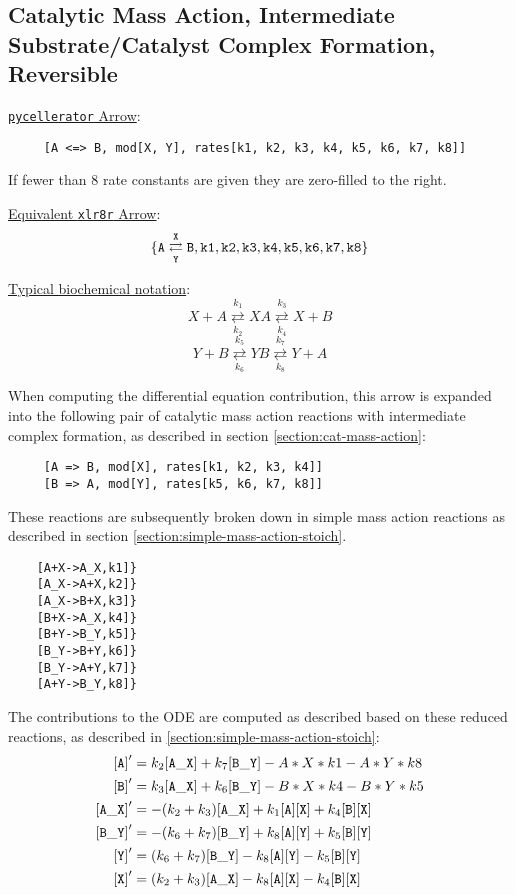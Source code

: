 \subsection{Catalytic Mass Action, Intermediate Substrate/Catalyst Complex Formation, Reversible}
\label{section:cat-mass-action-reversible}
\underline{{\tt pycellerator} Arrow}: 
\begin{lstlisting}
     [A <=> B, mod[X, Y], rates[k1, k2, k3, k4, k5, k6, k7, k8]]
\end{lstlisting}

If fewer than 8 rate constants are given they are zero-filled to the right. 

\underline{Equivalent {\tt xlr8r} Arrow}:
$$\tt\{A \underset{Y}{\overset{X}{\rightleftarrows}} B,k1,k2,k3,k4, k5, k6, k7, k8 \}$$

\underline{Typical biochemical notation}: 
$$ X+A\underset{k_2}{\overset{k_1}  \rightleftarrows } XA \underset{k_4}{ \overset{k_3}{\rightleftarrows}} X+B$$
$$ Y+B\underset{k_6}{\overset{k_5}  \rightleftarrows }  YB \underset{k_8}{ \overset{k_7}{\rightleftarrows}} Y+A$$

When computing the differential equation contribution, this arrow is expanded into the following pair of catalytic mass action reactions with intermediate complex formation, as described in section \ref{section:cat-mass-action}: 
\begin{lstlisting}
     [A => B, mod[X], rates[k1, k2, k3, k4]]
     [B => A, mod[Y], rates[k5, k6, k7, k8]]
\end{lstlisting}
These reactions are subsequently broken down in simple mass action reactions as described in section \ref{section:simple-mass-action-stoich}. 
\begin{lstlisting}
    [A+X->A_X,k1]} 
    [A_X->A+X,k2]}
    [A_X->B+X,k3]} 
    [B+X->A_X,k4]}
    [B+Y->B_Y,k5]}
    [B_Y->B+Y,k6]}
    [B_Y->A+Y,k7]}
    [A+Y->B_Y,k8]}
\end{lstlisting}
The contributions to the ODE are computed as described based on these reduced reactions, as described in \ref{section:simple-mass-action-stoich}: 
\begin{align*}
{\tt [A]}'    &=  k_2{\tt [A\_X]} + k_7{\tt [B\_Y]} - A*X*k1 - A*Y*k8\\
{\tt [B]}'    &=  k_3{\tt [A\_X]} + k_6{\tt [B\_Y]} - B*X*k4 - B*Y*k5\\
{\tt [A\_X]}' &= -(k_2+k_3){\tt [A\_X]} + k_1{\tt [A][X]} + k_4{\tt [B][X]}\\
{\tt [B\_Y]}' &= -(k_6+k_7){\tt [B\_Y]} + k_8{\tt [A][Y]} + k_5{\tt [B][Y]}\\
{\tt [Y]}'    &=  (k_6+k_7){\tt [B\_Y]} - k_8{\tt [A][Y]} - k_5{\tt [B][Y]}\\
{\tt [X]}   ' &=  (k_2+k_3){\tt [A\_X]} - k_8{\tt [A][X]} - k_4{\tt [B][X]}
\end{align*}



